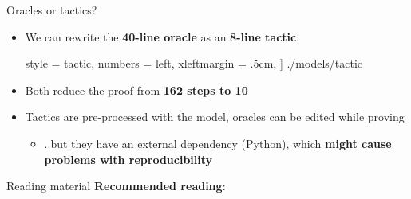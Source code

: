 \documentclass[11pt,aspectratio=169]{beamer}
\begin{document}
\begin{frame}[fragile]{Oracles or tactics?}
    \begin{itemize}
        \item We can rewrite the \textbf{40-line oracle} as an
              \textbf{8-line tactic}:
        \vspace*{.25cm}
        
            style = tactic,
            numbers = left,
            xleftmargin = .5cm,
        ] {./models/tactic}
        \item Both reduce the proof from \textbf{162 steps to 10}
        \item Tactics are pre-processed with the model, oracles can be edited 
              while proving
        \begin{itemize}
            \item ..but they have an external dependency (Python), which
                  \textbf{might cause problems with reproducibility}
        \end{itemize}
    \end{itemize}
\end{frame}

\begin{frame}[fragile]{Reading material}
    \textbf{Recommended reading}:
        ~\cite[Ch. 16]{tamarin-book}
    \printbibliography[heading=none]
\end{frame}
\end{document}
